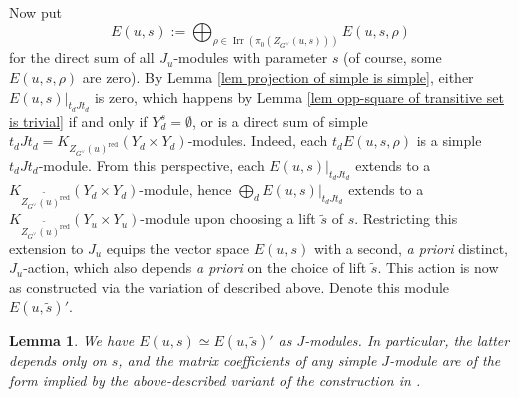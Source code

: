 \documentclass[10pt]{article}
\newcommand{\sets}[2]{\left\{#1\,\middle|\,#2\right\}}
\newcommand{\stab}[2]{\mathrm{Stab}_{#1}(#2)}
\DeclareMathOperator{\End}{End}
\DeclareMathOperator{\Irr}{Irr}
\newcommand{\C}{\mathbb{C}}
\newcommand{\Ad}{\mathrm{Ad}}
\newcommand{\Gm}{{\mathbb{G}_\mathrm{m}}}
\newtheorem{lem}{Lemma}
\theoremstyle{definition}
\theoremstyle{remark}
\newcommand{\hhh}{\mathrm{HH}_0}
\newcommand{\Zur}{Z_{G^\vee}(u)^{\mathrm{red}}}
\begin{document}
%
Now put
%
\[
E(u,s):=\bigoplus_{\rho\in\Irr\left(\pi_0\left(Z_{G^\vee}(u,s)\right)\right)}E(u,s,\rho)
\]
% 
for the direct sum of all $J_u$-modules with parameter $s$ (of course, some $E(u,s,\rho)$ are zero).
By Lemma \ref{lem projection of simple is simple}, either $E(u,s)|_{t_dJt_d}$ 
is zero, which happens by Lemma
\ref{lem opp-square of transitive set is trivial} if and only if $Y_d^s=\emptyset$, or is a 
direct sum of simple $t_dJt_d=K_{\Zur}(Y_d\times Y_d)$-modules. Indeed, each $t_dE(u,s,\rho)$ is a simple $t_dJt_d$-module.
From this perspective, each $E(u,s)|_{t_dJt_d}$ extends to 
a $K_{\widetilde{\Zur}}(Y_d\times Y_d)$-module, hence
$\bigoplus_d E(u,s)|_{t_dJt_d}$ extends to 
a $K_{\widetilde{\Zur}}(Y_u\times Y_u)$-module upon choosing a lift
$\tilde{s}$ of $s$. Restricting this 
extension to $J_u$ equips the vector space $E(u,s)$ with a second, 
\textit{a priori} distinct, $J_u$-action,
which also depends \textit{a priori} on the choice of lift $\tilde{s}$.
This action is now as constructed via the variation of 
\cite[Section 10]{cellsIV} described above. Denote this module 
$E(u,\tilde{s})'$. 
%
\begin{lem}
\label{lem mc are as implied by Lusztig}
We have $E(u,s)\simeq E(u,\tilde{s})'$ as $J$-modules.
In particular, the latter depends only on $s$, and
the matrix coefficients of any simple $J$-module are of the form implied by 
the above-described variant of the construction in 
\cite[Section 10]{cellsIV}.
\end{lem}
\end{document}
